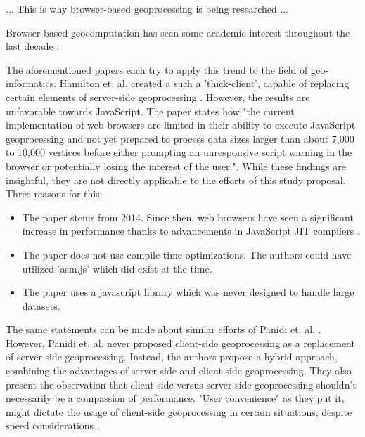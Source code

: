 ... This is why browser-based geoprocessing is being researched ...

Browser-based geocomputation has seen some academic interest throughout the last decade \cite{hamilton_client-side_2014, panidi_hybrid_2015, kulawiak_analysis_2019}.

The aforementioned papers each try to apply this trend to the field of geo-informatics. 
Hamilton et. al. created a such a 'thick-client', capable of replacing certain elements of server-side geoprocessing \cite{hamilton_client-side_2014}. 
However, the results are unfavorable towards JavaScript. 
The paper states how "the current implementation of web browsers are limited in their ability to execute JavaScript geoprocessing and not yet prepared to process data sizes larger than about 7,000 to 10,000 vertices before either prompting an unresponsive script warning in the browser or potentially losing the interest of the user.". While these findings are insightful, they are not directly applicable to the efforts of this study proposal. Three reasons for this:

\begin{itemize}
  \item The paper stems from 2014. Since then, web browsers have seen a significant increase in performance thanks to advancements in JavaScript JIT compilers \cite{haas_bringing_2017, kulawiak_analysis_2019}. 
  \item The paper does not use compile-time optimizations. The authors could have utilized 'asm.js' \cite{mozilla_asmjs_2013} which did exist at the time. 
  \item The paper uses a javascript library which was never designed to handle large datasets.
\end{itemize}

The same statements can be made about similar efforts of Panidi et. al. \cite{panidi_hybrid_2015}. 
However, Panidi et. al. never proposed client-side geoprocessing as a replacement of server-side geoprocessing. Instead, the authors propose a hybrid approach, combining the advantages of server-side and client-side geoprocessing. 
They also present the observation that client-side versus server-side geoprocessing shouldn't necessarily be a compassion of performance. 
"User convenience" as they put it, might dictate the usage of client-side geoprocessing in certain situations, despite speed considerations \cite{panidi_hybrid_2015}. 

